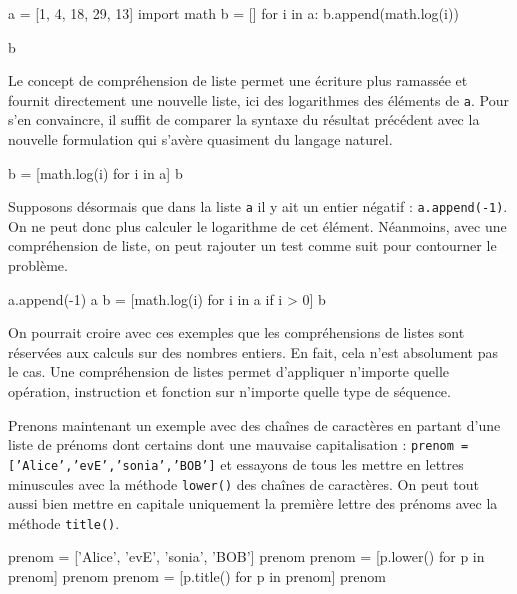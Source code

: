 \begin{idleconsole*}
\begin{pyconsole}
a = [1, 4, 18, 29, 13]
import math
b = []
for i in a:
    b.append(math.log(i))

b
\end{pyconsole}
\end{idleconsole*}

Le concept de compréhension de liste permet une écriture plus ramassée et fournit directement une nouvelle liste, ici des logarithmes des éléments de \texttt{a}. Pour s'en convaincre, il suffit de comparer la syntaxe du résultat précédent avec la nouvelle formulation qui s'avère quasiment du langage naturel.

\begin{idleconsole*}
\begin{pyconsole}
b = [math.log(i) for i in a]
b
\end{pyconsole}
\end{idleconsole*}

Supposons désormais que dans la liste \texttt{a} il y ait un entier négatif : \texttt{a.append(-1)}. On ne peut donc plus calculer le logarithme de cet élément. Néanmoins, avec une compréhension de liste, on peut rajouter un test comme suit pour contourner le problème.

\begin{idleconsole*}
\begin{pyconsole}
a.append(-1)
a
b = [math.log(i) for i in a if i > 0]
b
\end{pyconsole}
\end{idleconsole*}

On pourrait croire avec ces exemples que les compréhensions de listes sont réservées aux calculs sur des nombres entiers. En fait, cela n'est absolument pas le cas. Une compréhension de listes permet d'appliquer n'importe quelle opération, instruction et fonction sur n'importe quelle type de séquence.

Prenons maintenant un exemple avec des chaînes de caractères en partant d'une liste de prénoms dont certains dont une mauvaise capitalisation : \texttt{prenom = ['Alice','evE','sonia','BOB']} et essayons de tous les mettre en lettres minuscules avec la méthode \texttt{lower()} des chaînes de caractères. On peut tout aussi bien mettre en capitale uniquement la première lettre des prénoms avec la méthode \texttt{title()}.

\begin{idleconsole}
\begin{pyconsole}
prenom = ['Alice', 'evE', 'sonia', 'BOB']
prenom
prenom = [p.lower() for p in prenom]
prenom
prenom = [p.title() for p in prenom]
prenom
\end{pyconsole}
\end{idleconsole}

